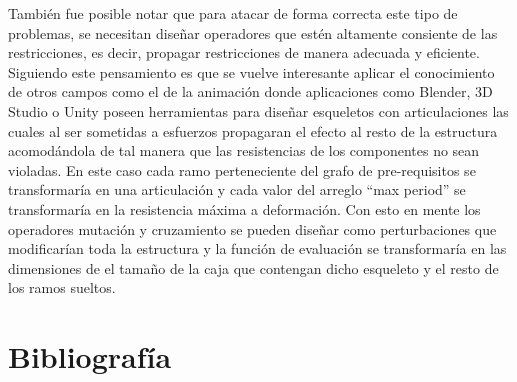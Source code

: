 \documentclass[letter, 10pt]{article}
\begin{document}
También fue posible notar que para atacar de forma correcta este tipo
de problemas, se necesitan diseñar operadores que estén altamente
consiente de las restricciones, es decir, propagar restricciones de
manera adecuada y eficiente. Siguiendo este pensamiento es que se
vuelve interesante aplicar el conocimiento de otros campos como el de
la animación donde aplicaciones como Blender, 3D Studio o Unity poseen
herramientas para diseñar esqueletos con articulaciones las cuales al
ser sometidas a esfuerzos propagaran el efecto al resto de la
estructura acomodándola de tal manera que las resistencias de los
componentes no sean violadas. En este caso cada ramo perteneciente del
grafo de pre-requisitos se transformaría en una articulación y cada
valor del arreglo ``max period'' se transformaría en la resistencia
máxima a deformación. Con esto en mente los operadores mutación y
cruzamiento se pueden diseñar como perturbaciones que modificarían
toda la estructura y la función de evaluación se transformaría en las
dimensiones de el tamaño de la caja que contengan dicho esqueleto y el
resto de los ramos sueltos.

\section{Bibliografía}


\end{document}
